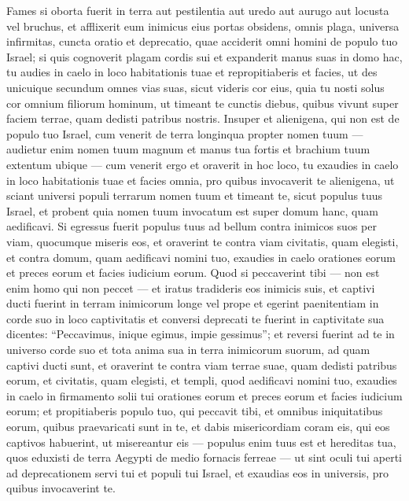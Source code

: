 \begin{biblechapter}
\verse Fames si oborta fuerit in terra aut pestilentia aut uredo aut aurugo aut locusta vel bruchus, et afflixerit eum inimicus eius portas obsidens, omnis plaga, universa infirmitas, 
\verse cuncta oratio et deprecatio, quae acciderit omni homini de populo tuo Israel; si quis cognoverit plagam cordis sui et expanderit manus suas in domo hac, 
\verse tu audies in caelo in loco habitationis tuae et repropitiaberis et facies, ut des unicuique secundum omnes vias suas, sicut videris cor eius, quia tu nosti solus cor omnium filiorum hominum, 
\verse ut timeant te cunctis diebus, quibus vivunt super faciem terrae, quam dedisti patribus nostris. 
\verse Insuper et alienigena, qui non est de populo tuo Israel, cum venerit de terra longinqua propter nomen tuum 
\verse — audietur enim nomen tuum magnum et manus tua fortis et brachium tuum extentum ubique — cum venerit ergo et oraverit in hoc loco, 
\verse tu exaudies in caelo in loco habitationis tuae et facies omnia, pro quibus invocaverit te alienigena, ut sciant universi populi terrarum nomen tuum et timeant te, sicut populus tuus Israel, et probent quia nomen tuum invocatum est super domum hanc, quam aedificavi. 
\verse Si egressus fuerit populus tuus ad bellum contra inimicos suos per viam, quocumque miseris eos, et oraverint te contra viam civitatis, quam elegisti, et contra domum, quam aedificavi nomini tuo, 
\verse exaudies in caelo orationes eorum et preces eorum et facies iudicium eorum. 
\verse Quod si peccaverint tibi — non est enim homo qui non peccet — et iratus tradideris eos inimicis suis, et captivi ducti fuerint in terram inimicorum longe vel prope 
\verse et egerint paenitentiam in corde suo in loco captivitatis et conversi deprecati te fuerint in captivitate sua dicentes: “Peccavimus, inique egimus, impie gessimus”; 
\verse et reversi fuerint ad te in universo corde suo et tota anima sua in terra inimicorum suorum, ad quam captivi ducti sunt, et oraverint te contra viam terrae suae, quam dedisti patribus eorum, et civitatis, quam elegisti, et templi, quod aedificavi nomini tuo, 
\verse exaudies in caelo in firmamento solii tui orationes eorum et preces eorum et facies iudicium eorum; 
\verse et propitiaberis populo tuo, qui peccavit tibi, et omnibus iniquitatibus eorum, quibus praevaricati sunt in te, et dabis misericordiam coram eis, qui eos captivos habuerint, ut misereantur eis 
\verse — populus enim tuus est et hereditas tua, quos eduxisti de terra Aegypti de medio fornacis ferreae — 
\verse ut sint oculi tui aperti ad deprecationem servi tui et populi tui Israel, et exaudias eos in universis, pro quibus invocaverint te. 

\end{biblechapter}
